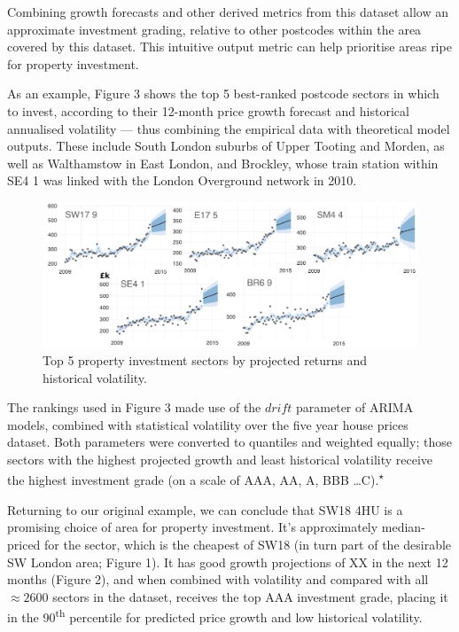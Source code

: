 \documentclass[
10pt, %
a4paper, %
oneside, %
headinclude,footinclude, %
BCOR5mm, %
]{scrartcl}
\begin{document}
Combining growth forecasts and other derived metrics from this
dataset allow an approximate investment grading, relative to other
postcodes within the area covered by this dataset. This intuitive
output metric can help prioritise areas ripe for property investment.

As an example, Figure 3 shows the top 5 best-ranked postcode sectors
in which to invest, according to their 12-month price growth forecast
and historical annualised volatility --- thus combining the empirical
data with theoretical model outputs. These include South London
suburbs of Upper Tooting and Morden, as well as Walthamstow in East
London, and Brockley,
whose train station within SE4 1 was linked with the London Overground network in 2010.\\

\begin{figure}[h]
\begin{center}
\includegraphics[width=.9\textwidth]{Figures/t5.pdf}
\caption{Top 5 property investment sectors by projected returns and historical volatility.}
\end{center}
\end{figure}

The rankings used in Figure 3 made use of the $drift$ parameter of
ARIMA models, combined with statistical volatility over the five year
house prices dataset. Both parameters were converted to quantiles and
weighted equally; those sectors with the highest projected growth
and least historical volatility receive the highest investment grade
(on a scale of AAA, AA, A, BBB \ldots C).\textsuperscript{$\star$}

Returning to our original example, we can conclude that SW18 4HU is a
promising choice of area for property investment. It's approximately
median-priced for the sector, which is the cheapest of SW18 (in turn
part of the desirable SW London area; Figure 1). It has good growth
projections of XX in the next 12 months (Figure 2), and when combined
with volatility and compared with all $\approx2600$ sectors in the
dataset, receives the top AAA investment grade, placing it in the
90\textsuperscript{th} percentile for predicted price growth and low
historical volatility.
\end{document}

